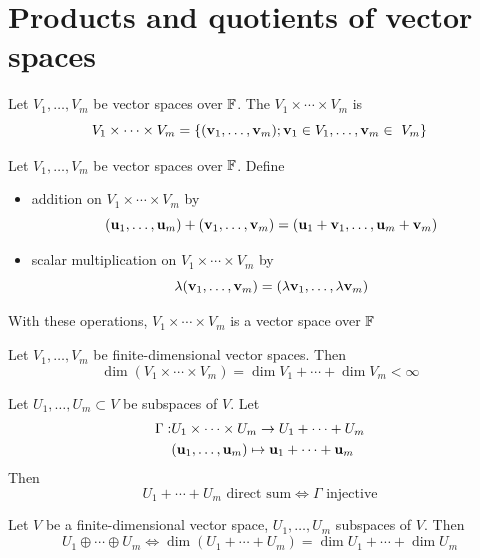 \documentclass[aspectratio=169]{beamer}
\begin{document}
\section{Products and quotients of vector spaces}

\begin{frame}
\begin{definition}
Let $V_1,\ldots,V_m$ be vector spaces over $\mathbb{F}$.
The  $V_1\times\cdots\times V_m$ is
\[
V_1\times\cdots\times V_m
=\left\{
(\mathbf{v}_1,\ldots,\mathbf{v}_m); \mathbf{v}_1\in V_1,\ldots,\mathbf{v}_m\in\ V_m
\right\}
\]
\end{definition}

\begin{importanttheorem}
Let $V_1,\ldots,V_m$ be vector spaces over $\mathbb{F}$. Define
\begin{itemize}
\item addition on $V_1\times\cdots\times V_m$ by
\[
(\mathbf{u}_1,\ldots,\mathbf{u}_m)+(\mathbf{v}_1,\ldots,\mathbf{v}_m)=(\mathbf{u}_1+\mathbf{v}_1,\ldots,\mathbf{u}_m+\mathbf{v}_m)
\]
\item scalar multiplication on  $V_1\times\cdots\times V_m$ by
\[
\lambda (\mathbf{v}_1,\ldots,\mathbf{v}_m)=(\lambda \mathbf{v}_1,\ldots,\lambda \mathbf{v}_m)
\]
\end{itemize}
With these operations, $V_1\times\cdots\times V_m$ is a vector space over $\mathbb{F}$
\end{importanttheorem}
\end{frame}

\begin{frame}
\begin{importanttheorem}
Let $V_1,\ldots,V_m$ be finite-dimensional vector spaces. Then
\[
\dim(V_1\times\cdots\times V_m)=\dim V_1+\cdots+\dim V_m<\infty
\]
\end{importanttheorem}
\end{frame}

\begin{frame}
\begin{theorem}
Let $U_1,\ldots,U_m\subset V$ be subspaces of $V$. Let
\begin{eqnarray*}
\Gamma: &
U_1\times\cdots\times U_m\to U_1+\cdots+U_m \\
& (\mathbf{u}_1,\ldots,\mathbf{u}_m) \mapsto \mathbf{u}_1+\cdots+\mathbf{u}_m
\end{eqnarray*}
Then
\[
U_1+\cdots+U_m\textrm{ direct sum}
\Leftrightarrow
\Gamma\textrm{ injective}
\]
\end{theorem}
\vfill
\begin{importanttheorem}
Let $V$ be a finite-dimensional vector space, $U_1,\ldots,U_m$ subspaces of $V$. Then
\[
U_1\oplus\cdots\oplus U_m
\Leftrightarrow
\dim(U_1+\cdots+U_m)=\dim U_1+\cdots+\dim U_m
\]
\end{importanttheorem}
\end{frame}
\end{document}
